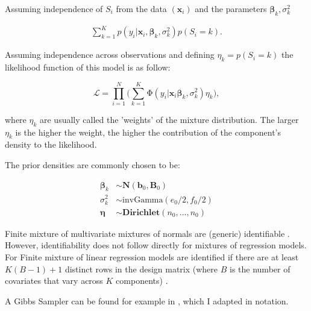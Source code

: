\documentclass[11pt,a4paper]{article}
\begin{document}
Assuming independence of $S_i$ from the data $(\mathbf{x}_i)$ and the parameters $\bm{\beta}_k, \sigma^2_k$ 

\begin{equation*}
\begin{split}
\sum_{k=1}^K p(y_i | \mathbf{x}_i, \bm{\beta}_k, \sigma^2_k) p(S_i=k). 
\end{split}
\end{equation*}


Assuming independence across observations and defining $\eta_k=p(S_i=k)$ the likelihood function of this model is as follow: 

\begin{equation*}
\mathcal{L} = \prod^{N}_{i=1} \bigg ( \sum_{k=1}^{K} \mathrm{\Phi} ( y_{i} | \mathbf{x}_i\boldsymbol{\beta}_k, \sigma^2_k ) \eta_k \bigg ), 
\end{equation*}

where $\eta_k$ are usually called the 'weights' of the mixture distribution. The larger $\eta_k$ is the higher the weight, the higher the contribution of the component's density to the likelihood. 

The prior densities are commonly chosen to be: 


\begin{equation*}
\begin{split}
\boldsymbol{\beta}_k &\sim \mathrm{\mathbf{N}}(\textbf{b}_0, \textbf{B}_0) \\
\sigma^2_k &\sim \mathrm{invGamma}(e_0/2, f_0/2) \\
\bm{\eta} &\sim \mathrm{\mathbf{Dirichlet}}(n_0, ..., n_0)
\end{split}
\end{equation*}

Finite mixture of multivariate mixtures of normals are (generic) identifiable \citep[21 and references therein]{FruehwirthSchnatter.2006}. However, identifiability does not follow directly for mixtures of regression models. For  Finite mixture of linear regression models are identified if there are at least $K(B-1)+1$ distinct rows in the design matrix (where $B$ is the number of covariates that vary across $K$ components) \citep[246]{FruehwirthSchnatter.2006}. 


A Gibbs Sampler can be found for example in \citep[p. 75, 253]{FruehwirthSchnatter.2006}, which I adapted in notation. 
\end{document}
